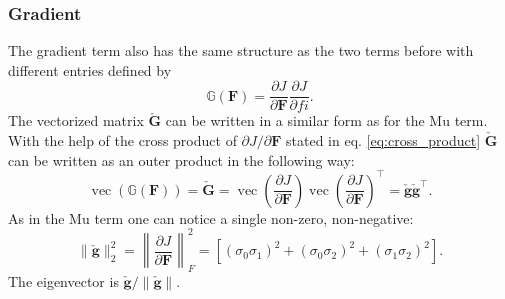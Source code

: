 \subsubsection{Gradient}
The gradient term also has the same structure as the two terms before with different entries defined by
\[
\mathbb{G}(\mathbf{F}) = \frac{\partial J}{\partial \mathbf{F}} \frac{\partial J}{\partial fi}.
\]
The vectorized matrix $\mathbf{\check{G}}$ can be written in a similar form as for the Mu term. With the help of the cross product of $\partial J / \partial \mathbf{F}$ stated in eq. \ref{eq:cross_product} $\mathbf{\check{G}}$ can be written as an outer product in the following way:
\[
\operatorname{vec}(\mathbb{G}(\mathbf{F})) = \mathbf{\check{G}} = \operatorname{vec}\left(\frac{\partial J}{\partial \mathbf{F}}\right) \operatorname{vec}\left(\frac{\partial J}{\partial \mathbf{F}}\right)^\intercal = \mathbf{\check{g}} \mathbf{\check{g}}^\intercal.
\]
As in the Mu term one can notice a single non-zero, non-negative:
\[
\| \mathbf{\check{g}} \|^2_2 = \left\| \frac{\partial J}{\partial \mathbf{F}} \right \|^2_F = \left[ (\sigma_0 \sigma_1)^2 + (\sigma_0 \sigma_2)^2 + (\sigma_1 \sigma_2)^2 \right].
\]
The eigenvector is $\mathbf{\check{g}} / \| \mathbf{\check{g}} \|$.




